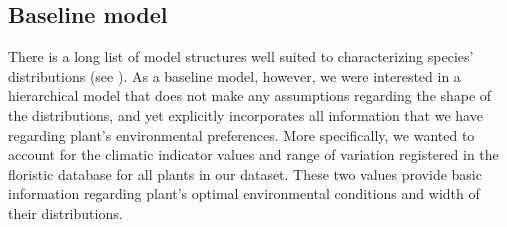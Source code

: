 \documentclass[11pt, a4paper]{article}
\begin{document}



\subsection*{Baseline model}
There is a long list of model structures well suited to characterizing species' distributions (see \citealt{norbergComprehensiveEvaluationPredictive2019}). As a baseline model, however, we were interested in a hierarchical model that does not make any assumptions regarding the shape of the distributions, and yet explicitly incorporates all information that we have regarding plant's environmental preferences. More specifically, we wanted to account for the climatic indicator values and range of variation registered in the floristic database for all plants in our dataset. These two values provide basic information regarding plant's optimal environmental conditions and width of their distributions.
\end{document}
